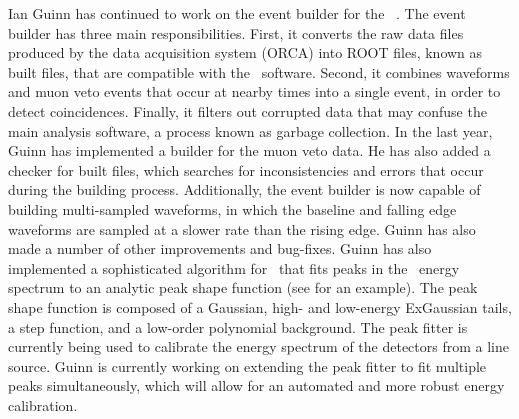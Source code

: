Ian Guinn has continued to work on the event builder for the \MJ\ \MJDemo. The event builder has three main responsibilities. First, it converts the raw data files produced by the data acquisition system (ORCA) into ROOT files, known as built files, that are compatible with the \MJ\ software. Second, it combines waveforms and muon veto events that occur at nearby times into a single event, in order to detect coincidences. Finally, it filters out corrupted data that may confuse the main analysis software, a process known as garbage collection. In the last year, Guinn has implemented a builder for the muon veto data. He has also added a checker for built files, which searches for inconsistencies and errors that occur during the building process. Additionally, the event builder is now capable of building multi-sampled waveforms, in which the baseline and falling edge waveforms are sampled at a slower rate than the rising edge. Guinn has also made a number of other improvements and bug-fixes.\newline
\indent Guinn has also implemented a sophisticated algorithm for \MJ\ that fits peaks in the \MJDemo\ energy spectrum to an analytic peak shape function (see  for an example). The peak shape function is composed of a Gaussian, high- and low-energy ExGaussian tails, a step function, and a low-order polynomial background. The peak fitter is currently being used to calibrate the energy spectrum of the detectors from a  line source. Guinn is currently working on extending the peak fitter to fit multiple peaks simultaneously, which will allow for an automated and more robust energy calibration.

%
%
%

